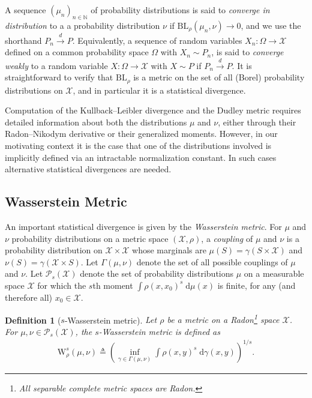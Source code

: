 \documentclass[12pt,paper=letter]{scrreprt}
\newtheorem{definition}{Definition}[chapter]
\def\defeq{\triangleq} %
\begin{document}
\noindent A sequence $(\mu_n)_{n \in \mathbb{N}}$ of probability distributions is said to \emph{converge in distribution} to a a probability distribution $\nu$ if $\mathrm{BL}_\rho(\mu_n , \nu) \rightarrow 0$, and we use the shorthand $P_n \stackrel{d}{\rightarrow} P$.
Equivalently, a sequence of random variables $X_n : \Omega \rightarrow \mathcal{X}$ defined on a common probability space $\Omega$ with $X_n \sim P_n$, is said to \emph{converge weakly} to a random variable $X : \Omega \rightarrow \mathcal{X}$ with $X \sim P$ if $P_n \stackrel{d}{\rightarrow} P$.
It is straightforward to verify that $\mathrm{BL}_\rho$ is a metric on the set of all (Borel) probability distributions on $\mathcal{X}$, and in particular it is a statistical divergence.

Computation of the Kullback--Leibler divergence and the Dudley metric requires detailed information about both the distributions $\mu$ and $\nu$, either through their Radon--Nikodym derivative or their generalized moments. 
However, in our motivating context it is the case that one of the distributions involved is implicitly defined via an intractable normalization constant.
In such cases alternative statistical divergences are needed.


\subsection{Wasserstein Metric}
\label{subsec: wass metric}

An important statistical divergence is given by the \emph{Wasserstein metric}.
For $\mu$ and $\nu$ probability distributions on a metric space $(\mathcal{X},\rho)$, a \emph{coupling} of $\mu$ and $\nu$ is a probability distribution on $\mathcal{X} \times \mathcal{X}$ whose marginals are $\mu(S) = \gamma(S \times \mathcal{X})$ and $\nu(S) = \gamma(\mathcal{X} \times S)$.
Let $\Gamma(\mu,\nu)$ denote the set of all possible couplings of $\mu$ and $\nu$.
Let $\mathcal{P}_s(\mathcal{X})$ denote the set of probability distributions $\mu$ on a measurable space $\mathcal{X}$ for which the $s$th moment $\int \rho(x,x_0)^s \; \mathrm{d}\mu(x)$ is finite, for any (and therefore all) $x_0 \in \mathcal{X}$.

\begin{definition}[$s$-Wasserstein metric]
    \label{def: Wasserstein}
    Let $\rho$ be a metric on a Radon\footnote{All separable complete metric spaces are Radon.} space $\mathcal{X}$.
    For $\mu , \nu \in \mathcal{P}_s(\mathcal{X})$, the $s$-\emph{Wasserstein metric} is defined as
    \begin{align*}
        \mathrm{W}_\rho^s(\mu,\nu) \defeq \left( \inf_{\gamma \in \Gamma(\mu,\nu)} \int \rho(x,y)^s \; \mathrm{d}\gamma(x,y) \right)^{1/s} .
    \end{align*}
\end{definition}
\end{document}
